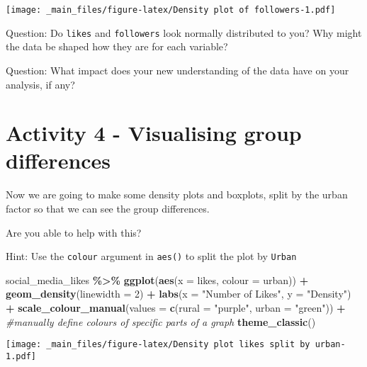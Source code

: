 \documentclass[
]{book}
\newenvironment{Shaded}{\begin{snugshade}}{\end{snugshade}}
\newcommand{\AttributeTok}[1]{\textcolor[rgb]{0.13,0.29,0.53}{#1}}
\newcommand{\CommentTok}[1]{\textcolor[rgb]{0.56,0.35,0.01}{\textit{#1}}}
\newcommand{\DecValTok}[1]{\textcolor[rgb]{0.00,0.00,0.81}{#1}}
\newcommand{\FunctionTok}[1]{\textcolor[rgb]{0.13,0.29,0.53}{\textbf{#1}}}
\newcommand{\NormalTok}[1]{#1}
\newcommand{\SpecialCharTok}[1]{\textcolor[rgb]{0.81,0.36,0.00}{\textbf{#1}}}
\newcommand{\StringTok}[1]{\textcolor[rgb]{0.31,0.60,0.02}{#1}}
\begin{document}
\texttt{[image: \_main\_files/figure-latex/Density plot of followers-1.pdf]}

Question: Do \texttt{likes} and \texttt{followers} look normally distributed to you? Why might the data be shaped how they are for each variable?

Question: What impact does your new understanding of the data have on your analysis, if any?

\section{Activity 4 - Visualising group differences}\label{activity-4---visualising-group-differences}

Now we are going to make some density plots and boxplots, split by the urban factor so that we can see the group differences.

Are you able to help with this?

Hint: Use the \texttt{colour} argument in \texttt{aes()} to split the plot by \texttt{Urban}

\begin{Shaded}
\begin{Highlighting}[]
\NormalTok{social\_media\_likes }\SpecialCharTok{\%\textgreater{}\%} 
  \FunctionTok{ggplot}\NormalTok{(}\FunctionTok{aes}\NormalTok{(}\AttributeTok{x =}\NormalTok{ likes, }\AttributeTok{colour =}\NormalTok{ urban)) }\SpecialCharTok{+}
  \FunctionTok{geom\_density}\NormalTok{(}\AttributeTok{linewidth =} \DecValTok{2}\NormalTok{) }\SpecialCharTok{+}
  \FunctionTok{labs}\NormalTok{(}\AttributeTok{x =} \StringTok{"Number of Likes"}\NormalTok{, }\AttributeTok{y =} \StringTok{"Density"}\NormalTok{) }\SpecialCharTok{+}
  \FunctionTok{scale\_colour\_manual}\NormalTok{(}\AttributeTok{values =} \FunctionTok{c}\NormalTok{(}\AttributeTok{rural =} \StringTok{"purple"}\NormalTok{, }\AttributeTok{urban =} \StringTok{"green"}\NormalTok{)) }\SpecialCharTok{+} \CommentTok{\#manually define colours of specific parts of a graph}
  \FunctionTok{theme\_classic}\NormalTok{() }
\end{Highlighting}
\end{Shaded}

\texttt{[image: \_main\_files/figure-latex/Density plot likes split by urban-1.pdf]}
\end{document}
